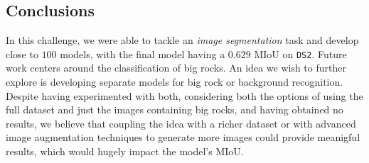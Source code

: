 \documentclass[11pt]{article}
\begin{document}
\begin{multicols}{2}
      \section{Conclusions}
      \label{sec:conclusions}

      In this challenge, we were able to tackle an \textit{image segmentation} task and develop close to $100$ models, with the final model having a $0.629$ MIoU on \texttt{DS2}. Future work centers around the classification of big rocks. An idea we wish to further explore is developing separate models for big rock or background recognition. Despite having experimented with both, considering both the options of using the full dataset and just the images containing big rocks, and having obtained no results, we believe that coupling the idea with a richer dataset or with advanced image augmentation techniques to generate more images could provide meanigful results, which would hugely impact the model's MIoU.

      
      

\end{multicols}
\end{document}
